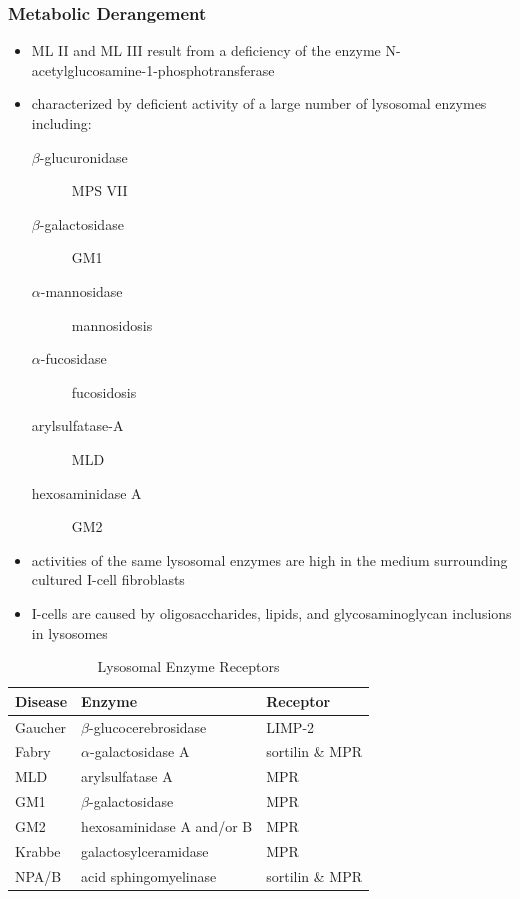 \documentclass[12pt]{scrartcl}
\begin{document}
\subsubsection{Metabolic Derangement}
\label{sec:org5f0d54f}
\begin{itemize}
\item ML II and ML III result from a deficiency of the enzyme
N-acetylglucosamine-1-phosphotransferase

\item characterized by deficient activity of a large number of lysosomal enzymes including:
\begin{description}
\item[{\(\beta\)-glucuronidase}] MPS VII
\item[{\(\beta\)-galactosidase}] GM1
\item[{\(\alpha\)-mannosidase}] mannosidosis
\item[{\(\alpha\)-fucosidase}] fucosidosis
\item[{arylsulfatase-A}] MLD
\item[{hexosaminidase A}] GM2
\end{description}
\item activities of the same lysosomal enzymes are high in the medium
surrounding cultured I-cell fibroblasts

\item I-cells are caused by oligosaccharides, lipids, and
glycosaminoglycan inclusions in lysosomes
\end{itemize}

\begin{table}[htbp]
\caption{\label{tab:orgca60345}Lysosomal Enzyme Receptors}
\centering
\begin{tabular}{lll}
Disease & Enzyme & Receptor\\
\hline
Gaucher & \(\beta\)-glucocerebrosidase & LIMP-2\\
Fabry & \(\alpha\)-galactosidase A & sortilin \& MPR\\
MLD & arylsulfatase A & MPR\\
GM1 & \(\beta\)-galactosidase & MPR\\
GM2 & hexosaminidase A and/or B & MPR\\
Krabbe & galactosylceramidase & MPR\\
NPA/B & acid sphingomyelinase & sortilin \& MPR\\
\end{tabular}
\end{table}
\end{document}
